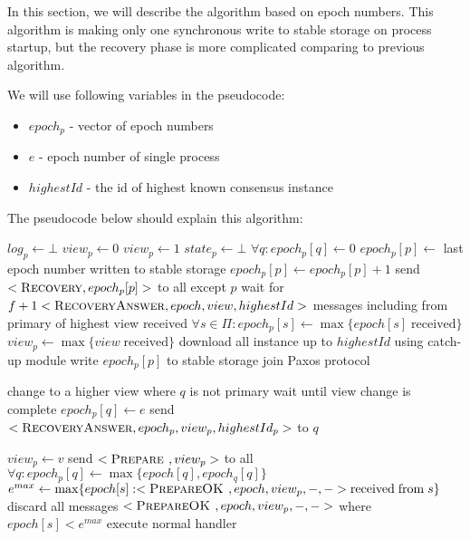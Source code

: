 In this section, we will describe the algorithm based on epoch numbers. This algorithm is making only one synchronous write to stable storage on process startup, but the recovery phase is more complicated comparing to previous algorithm.

We will use following variables in the pseudocode:
\begin{itemize}
  \item $epoch_p$ - vector of epoch numbers
  \item $e$ - epoch number of single process
  \item $highestId$ - the id of highest known consensus instance
\end{itemize}

The pseudocode below should explain this algorithm:
\begin{algorithmic}[1]
  \INIT{}
    \STATE $log_p \leftarrow \bot$ %
    \STATE $view_p \leftarrow 0$
      \STATE $view_p \leftarrow 1$
    \ENDIF
    \STATE $state_p \leftarrow \bot$ %
    \STATE $\forall q : epoch_p[q] \leftarrow 0$
    \STATE
      \STATE $epoch_p[p] \leftarrow$ last epoch number written to stable storage
      \STATE $epoch_p[p] \leftarrow epoch_p[p] + 1$
      \STATE send $<\textsc{Recovery}, epoch_p[p]>$ to all except $p$
      \STATE wait for $f+1 <\textsc{RecoveryAnswer}, epoch, view, highestId>$ messages including from primary of highest view received
      \STATE $\forall s \in \Pi : epoch_p[s] \leftarrow \max\{{epoch[s] \; \mathrm{ received}}\}$
      \STATE $view_p \leftarrow \max\{{ view \; \mathrm{received}}\}$
      \STATE download all instance up to $highestId$ using catch-up module
    \ENDIF
      \STATE write $epoch_p[p]$ to stable storage
    \STATE
    \STATE join Paxos protocol
  \ENDINIT

  \vspace{1em}
      \STATE change to a higher view where $q$ is not primary
      \STATE wait until view change is complete
    \ENDIF
    \STATE $epoch_p[q] \leftarrow e$
    \STATE send $<\textsc{RecoveryAnswer}, epoch_p, view_p, highestId_p>$ to $q$
  \ENDUPON

  \vspace{1em}
      \STATE $view_p \leftarrow v$
      \STATE send $<\textsc{Prepare }, view_p>$ to all
    \ELSE
      \STATE $\forall q : epoch_p[q] \leftarrow \max\{{epoch[q], epoch_q[q]}\}$
        \STATE $e^{max} \leftarrow \max\{{epoch[s] : <\textsc{PrepareOK }, epoch, view_p, -, -> \mathrm{received \; from}\; s}\}$
        \STATE discard all messages $<\textsc{PrepareOK }, epoch, view_p, -, ->$ where $epoch[s] < e^{max}$
      \ENDFOR
      \STATE execute normal handler 
    \ENDIF
  \ENDUPON
\end{algorithmic}

